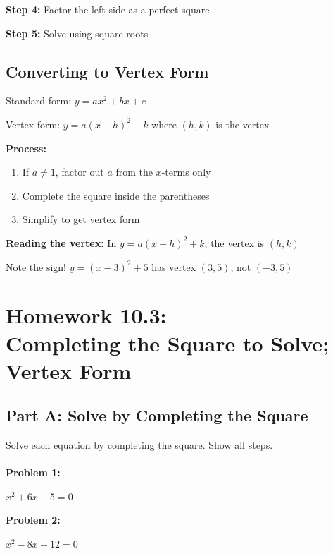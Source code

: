 \documentclass[12pt]{article}
\begin{document}
			\textbf{Step 4:} Factor the left side as a perfect square

			\textbf{Step 5:} Solve using square roots

		\subsection*{Converting to Vertex Form}

			Standard form: $y = ax^2 + bx + c$

			Vertex form: $y = a(x - h)^2 + k$ where $(h, k)$ is the vertex

			\textbf{Process:}
			\begin{enumerate}
				\item If $a \neq 1$, factor out $a$ from the $x$-terms only
				\item Complete the square inside the parentheses
				\item Simplify to get vertex form
			\end{enumerate}

			\textbf{Reading the vertex:} In $y = a(x - h)^2 + k$, the vertex is $(h, k)$

			Note the sign! $y = (x - 3)^2 + 5$ has vertex $(3, 5)$, not $(-3, 5)$

		\newpage

	\section*{Homework 10.3: \\ Completing the Square to Solve; Vertex Form}

		\subsection*{Part A: Solve by Completing the Square}

			Solve each equation by completing the square. Show all steps.\\\\

			\textbf{Problem 1:}
            
            $x^2 + 6x + 5 = 0$

			\vspace{4cm}

			\textbf{Problem 2:}
            
            $x^2 - 8x + 12 = 0$

			\vspace{4cm}
\end{document}
